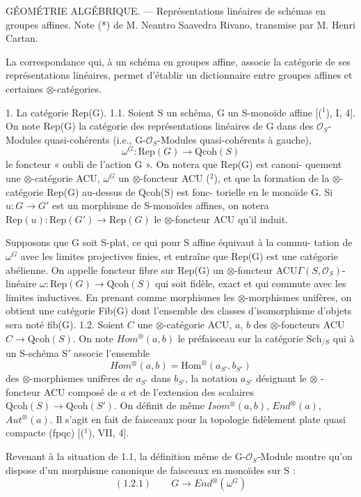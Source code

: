 
GÉOMÉTRIE ALGÉBRIQUE. --- Représentations linéaires de schémas
en groupes affines. Note (*) de M. Neantro Saavedra Rivano, transmise
par M. Henri Cartan.

La correspondance qui, à un schéma en groupes affine, associe la catégorie de
ses représentations linéaires, permet d'établir un dictionnaire entre groupes affines
et certaines $\otimes$-catégories.

1. La catégorie Rep(G).
1.1. Soient S un schéma, G un S-monoïde affine [($^1$), I, 4]. On note
Rep(G) la catégorie des représentations linéaires de G dans des $\mathcal{O}_S$-Modules
quasi-cohérents (i.e., G-$\mathcal{O}_S$-Modules quasi-cohérents à gauche),
\[ \omega^G : \mathrm{Rep}(G) \to \mathrm{Qcoh}(S) \]
le foncteur « oubli de l'action G ». On notera que Rep(G) est canoni-%
quement une $\otimes$-catégorie ACU, $\omega^G$ un $\otimes$-foncteur ACU ($^2$), et que la
formation de la $\otimes$-catégorie Rep(G) au-dessus de Qcoh(S) est fonc-%
torielle en le monoïde G. Si $u : G \to G'$ est un morphisme de S-monoïdes
affines, on notera $\mathrm{Rep}(u) : \mathrm{Rep}(G') \to \mathrm{Rep}(G)$ le $\otimes$-foncteur ACU qu'il
induit. \margin{\unsure{/}}

Supposons que G soit S-plat, ce qui pour S affine équivaut à la commu-%
tation de $\omega^G$ avec les limites projectives finies, et entraîne que Rep(G)
est une catégorie abélienne. On appelle foncteur fibre sur Rep(G) un
$\otimes$-foncteur ACU$\Gamma(S, \mathcal{O}_S)$-linéaire $\omega : \mathrm{Rep}(G) \to \mathrm{Qcoh}(S)$ qui soit fidèle,
exact et qui commute avec les limites inductives. En prenant comme
morphismes les $\otimes$-morphismes unifères, on obtient une catégorie Fib(G)
dont l'ensemble des classes d'isomorphisme d'objets sera noté fib(G).
1.2. Soient $C$ une $\otimes$-catégorie ACU, $a$, $b$ des $\otimes$-foncteurs
ACU $C \to \mathrm{Qcoh}(S)$. On note $Hom^{\otimes}(a, b)$ le préfaisceau sur la catégorie
$\mathrm{Sch}_{/S}$ qui à un S-schéma S$'$ associe l'ensemble
\[ Hom^{\otimes}(a, b) = \mathrm{Hom}^{\otimes}(a_{S'}, b_{S'}) \]
des $\otimes$-morphismes unifères de $a_{S'}$ dans $b_{S'}$, la notation $a_{S'}$ désignant le
$\otimes$ - foncteur ACU composé de $a$ et de l'extension des scalaires
$\mathrm{Qcoh}(S) \to \mathrm{Qcoh}(S')$. On définit de même $Isom^{\otimes}(a, b)$, $End^{\otimes}(a)$, $Aut^{\otimes}(a)$.
Il s'agit en fait de faisceaux pour la topologie fidèlement plate quasi
compacte (fpqc) [($^1$), VII, 4].

Revenant à la situation de 1.1, la définition même de G-$\mathcal{O}_S$-Module
montre qu'on dispose d'un morphisme canonique de faisceaux en monoïdes
sur S :
\[ (1.2.1) \qquad G \to End^{\otimes}(\omega^G) \]

